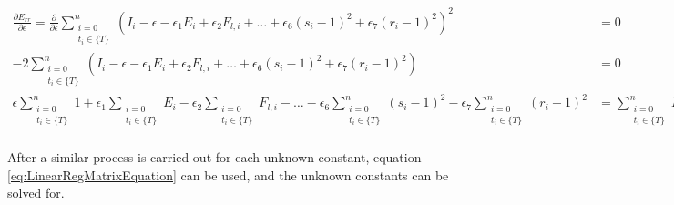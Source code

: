 \begin{equation*}
    \begin{split}
        \frac{\partial E_{rr}}{\partial \epsilon}=
        \frac{\partial}{\partial \epsilon}\sum_{
                \substack{i=0\\ t_i\in \{ T \}}
            }^n \left(
            I_i
            -\epsilon
            -\epsilon_1 E_i
            +\epsilon_2 F_{l,i}
            +\dots
            +\epsilon_6 (s_i-1)^2
            +\epsilon_7 (r_i-1)^2
        \right)^2&=0\\
        -2\sum_{
                \substack{i=0\\ t_i\in \{ T \}}
            }^n \left(
            I_i
            -\epsilon
            -\epsilon_1 E_i
            +\epsilon_2 F_{l,i}
            +\dots
            +\epsilon_6(s_i-1)^2
            +\epsilon_7(r_i-1)^2
        \right)&=0\\
        \epsilon \sum_{\substack{i=0\\ t_i\in \{ T \}}}^n 1 
        +\epsilon_1 \sum_{\substack{i=0\\ t_i\in \{ T \}}} E_i
        -\epsilon_2 \sum_{\substack{i=0\\ t_i\in \{ T \}}} F_{l,i}
        -\dots
        -\epsilon_6 \sum_{\substack{i=0\\ t_i\in \{ T \}}}^n (s_i-1)^2
        -\epsilon_7 \sum_{\substack{i=0\\ t_i\in \{ T \}}}^n (r_i-1)^2
        &=
        \sum_{\substack{i=0\\ t_i\in \{ T \}}}^n I_i\\
    \end{split}
\end{equation*}

After a similar process is carried out for each unknown constant, equation \ref{eq:LinearRegMatrixEquation} can be used, and the unknown constants can be solved for.

